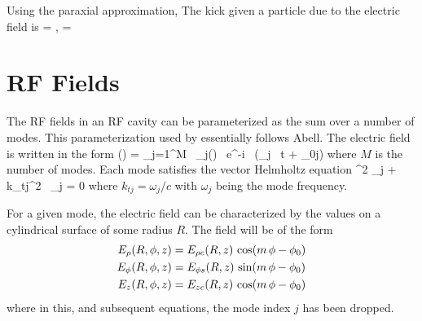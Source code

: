 Using the paraxial approximation, The kick given a particle due to the electric field is
\Begineq
   = , \qquad {} = 
\Endeq

\section{RF Fields}
\label{s:rf.fields.phys}

The RF fields in an RF cavity can be parameterized as the sum over a
number of modes. This parameterization used by \bmad essentially
follows Abell\cite{b:rf.abell}. The electric field is written in the
form
\Begineq
  \bfE(\bfr) = \sum_{j=1}^M \, \bfE_j(\bfr) \, e^{-i \, (\omega_j \, t + \theta_{0j})}
  \label{eseei}
\Endeq
where $M$ is the number of modes. Each mode satisfies the vector Helmholtz
equation
\Begineq
  \nabla^2 \bfE_j + k_{tj}^2 \, \bfE_j = 0
  \label{bke}
\Endeq
where $k_{tj} = \omega_j/c$ with $\omega_j$ being the mode frequency.

For a given mode, the electric field can be characterized by the values on 
a cylindrical surface of some radius $R$. The field will be of the form
\begin{align}
  E_\rho(R, \phi, z) &= E_{\rho c}(R, z) \, \cos(m \, \phi - \phi_0) \nonumber \\
  E_\phi(R, \phi, z) &= E_{\phi s}(R, z) \, \sin(m \, \phi - \phi_0) \\
  \label{erpze}
  E_z(R, \phi, z)    &= E_{z c}(R, z)    \, \cos(m \, \phi - \phi_0) \nonumber
\end{align}
where in this, and subsequent equations, the mode index $j$ has been
dropped.

